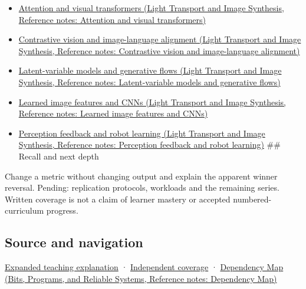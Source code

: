 \begin{itemize}
\tightlist
\item
  \href{../04-Light-Transport-and-Image-Synthesis/main.pdf\#nameddest=appendix-a9d5dfdd164a}{Attention and visual transformers (Light Transport and Image Synthesis, Reference notes: Attention and visual transformers)}
\item
  \href{../04-Light-Transport-and-Image-Synthesis/main.pdf\#nameddest=appendix-772f1fd96148}{Contrastive vision and image-language alignment (Light Transport and Image Synthesis, Reference notes: Contrastive vision and image-language alignment)}
\item
  \href{../04-Light-Transport-and-Image-Synthesis/main.pdf\#nameddest=appendix-2c568f05ee34}{Latent-variable models and generative flows (Light Transport and Image Synthesis, Reference notes: Latent-variable models and generative flows)}
\item
  \href{../04-Light-Transport-and-Image-Synthesis/main.pdf\#nameddest=appendix-47c51ea026fb}{Learned image features and CNNs (Light Transport and Image Synthesis, Reference notes: Learned image features and CNNs)}
\item
  \href{../04-Light-Transport-and-Image-Synthesis/main.pdf\#nameddest=appendix-b0c42da325f1}{Perception feedback and robot learning (Light Transport and Image Synthesis, Reference notes: Perception feedback and robot learning)} \#\# Recall and next depth
\end{itemize}

Change a metric without changing output and explain the apparent winner reversal. Pending: replication protocols, workloads and the remaining series. Written coverage is not a claim of learner mastery or accepted numbered-curriculum progress.

\subsection{Source and navigation}\label{appendix-65788587ef78-source-and-navigation}

\hyperref[04-visual-computing-ii-ch042-make-the-mathematics-operational-without-pretending-to-run-a-human-study]{Expanded teaching explanation} · \hyperref[appendix-fd090d982a15-xr01---independent-seeing-and-representation-source]{Independent coverage} · \href{../01-Bits-Programs-and-Reliable-Systems/main.pdf\#nameddest=appendix-4ad47bdd269a}{Dependency Map (Bits, Programs, and Reliable Systems, Reference notes: Dependency Map)}
